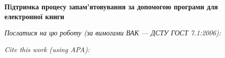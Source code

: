 \documentclass[a4paper,14pt,article]{memoir}
\newcommand{\articleTitleUkr}{
	Пiдтримка процесу запам’ятовування за допомогою програми для електронної книги}
\begin{document}
	
	\begin{center}
		\par\textbf{\MakeUppercase\articleTitleUkr}
		\par\textbf{\authorFullNameUkr}
	\end{center}
	
	\par\bigskip\textit{Послатися на цю роботу (за вимогами ВАК --- ДСТУ ГОСТ 7.1:2006):}
	\par{}
	\par\bigskip\textit{Cite this work (using APA):}
	\par{}
	
	
\end{document}
